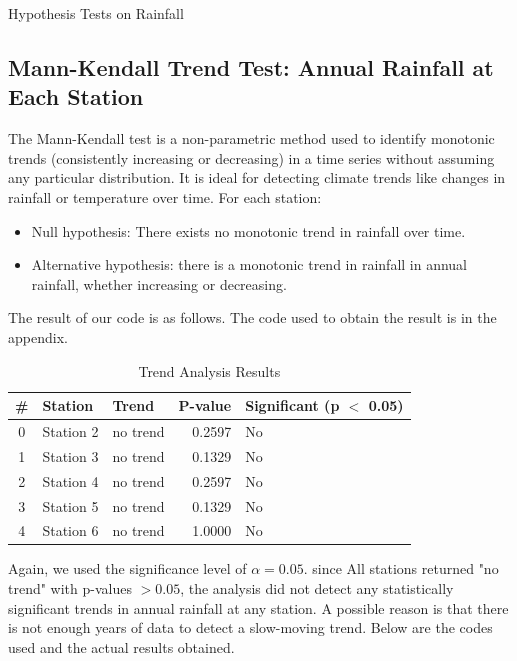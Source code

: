 \documentclass[12pt]{article}
\theoremstyle{definition}
\begin{document}
\begin{section}{Hypothesis Tests on Rainfall}
\subsection{Mann-Kendall Trend Test: Annual Rainfall at Each Station}
The Mann-Kendall test is a non-parametric method used to identify monotonic trends (consistently increasing or decreasing) in a time series without assuming any particular distribution. It is ideal for detecting climate trends like changes in rainfall or temperature over time. For each station:
\begin{itemize}
    \item Null hypothesis: There exists no monotonic trend in rainfall over time.
    \item Alternative hypothesis: there is a monotonic trend in rainfall in annual rainfall, whether increasing or decreasing.
\end{itemize}

The result of our code is as follows. The code used to obtain the result is in the appendix.
\begin{table}[H]
\centering
\caption{Trend Analysis Results}
\label{tab:trend_analysis}
\begin{tabular}{|c|l|l|r|l|}
\hline
\textbf{\#} & \textbf{Station} & \textbf{Trend} & \textbf{P-value} & \textbf{Significant (p $<$ 0.05)} \\
\hline
0 & Station 2 & no trend & 0.2597 & No \\
\hline
1 & Station 3 & no trend & 0.1329 & No \\
\hline
2 & Station 4 & no trend & 0.2597 & No \\
\hline
3 & Station 5 & no trend & 0.1329 & No \\
\hline
4 & Station 6 & no trend & 1.0000 & No \\
\hline
\end{tabular}
\end{table}
Again, we used the significance level of $\alpha=0.05$. since All stations returned "no trend" with p-values $> 0.05$, the analysis did not detect any statistically significant trends in annual rainfall at any station. A possible reason is that there is not enough years of data to detect a slow-moving trend. Below are the codes used and the actual results obtained.

\end{section}
\end{document}
